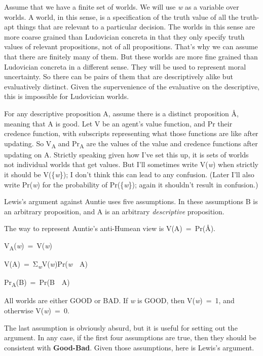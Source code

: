 \documentclass[
  11pt,
  letterpaper,
  DIV=11,
  numbers=noendperiod,
  twoside]{scrartcl}
\providecommand{\tightlist}{%
  \setlength{\itemsep}{0pt}\setlength{\parskip}{0pt}}\usepackage{longtable,booktabs,array}
\begin{document}
Assume that we have a finite set of worlds. We will use \emph{w} as a
variable over worlds. A world, in this sense, is a specification of the
truth value of all the truth-apt things that are relevant to a
particular decision. The worlds in this sense are more coarse grained
than Ludovician concreta in that they only specify truth values of
relevant propositions, not of all propositions. That's why we can assume
that there are finitely many of them. But these worlds are more fine
grained than Ludovician concreta in a different sense. They will be used
to represent moral uncertainty. So there can be pairs of them that are
descriptively alike but evaluatively distinct. Given the supervenience
of the evaluative on the descriptive, this is impossible for Ludovician
worlds.

For any descriptive proposition A, assume there is a distinct
proposition Å, meaning that A is good. Let V be an agent's value
function, and Pr their credence function, with subscripts representing
what those functions are like after updating. So V\textsubscript{A} and
Pr\textsubscript{A} are the values of the value and credence functions
after updating on A. Strictly speaking given how I've set this up, it is
sets of worlds not individual worlds that get values. But I'll sometimes
write V(\emph{w}) when strictly it should be V(\{\emph{w}\}); I don't
think this can lead to any confusion. (Later I'll also write
Pr(\emph{w}) for the probability of Pr(\{\emph{w}\}); again it shouldn't
result in confusion.)

Lewis's argument against Auntie uses five assumptions. In these
assumptions B is an arbitrary proposition, and A is an arbitrary
\emph{descriptive} proposition.

\begin{description}
\tightlist
\item[Equation]
The way to represent Auntie's anti-Humean view is V(A)~=~Pr(Å).
\item[Invariance]
V\textsubscript{A}(\emph{w})~=~V(\emph{w})
\item[Additivity]
V(A)~=~Σ\textsubscript{\emph{w}}V(\emph{w})Pr(\emph{w}~\textbar~A)
\item[Restricted Conditionalisation]
Pr\textsubscript{A}(B)~=~Pr(B~\textbar~A)
\item[Good-Bad]
All worlds are either GOOD or BAD. If \emph{w} is GOOD, then
V(\emph{w})~=~1, and otherwise V(\emph{w})~=~0.
\end{description}

The last assumption is obviously absurd, but it is useful for setting
out the argument. In any case, if the first four assumptions are true,
then they should be consistent with \textbf{Good-Bad}. Given those
assumptions, here is Lewis's argument.
\end{document}
